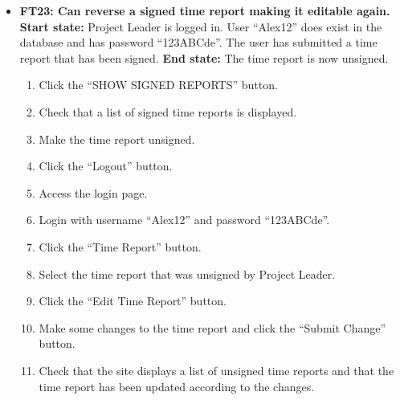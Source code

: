 \documentclass{article}
\begin{document}
\begin{itemize}
		\item \textbf{FT23: Can reverse a signed time report making it editable again.}\newline
		\textbf{Start state:} Project Leader is logged in. User “Alex12” does exist in the database and has password “123ABCde”. The user has submitted a time report that has been signed.
 \newline 
		\textbf{End state:} The time report is now unsigned.
		\begin{enumerate}
			\item Click the “SHOW SIGNED REPORTS” button.
			\item Check that a list of signed time reports is displayed.
			\item Make the time report unsigned.
			\item Click the “Logout” button.
			\item Access the login page.
			\item Login with username “Alex12” and password “123ABCde”.
			\item Click the “Time Report” button.
			\item Select the time report that was unsigned by Project Leader.
			\item Click the “Edit Time Report” button.
			\item Make some changes to the time report and click the “Submit Change” button.
			\item Check that the site displays a list of unsigned time reports and that the time report has been updated according to the changes.
		\end{enumerate}
\end{itemize}
\end{document}
